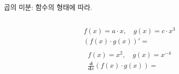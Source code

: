 \documentclass[aspectratio=169]{beamer}
\begin{document}
\begin{frame}{곱의 미분: 함수의 형태에 따라.}
  \begin{columns}
    \begin{column}{.5\textwidth}
      \begin{align*}
        & f(x) = a \cdot x , \quad g(x) = c \cdot x^3 \\
        & (f(x) \cdot g(x))' = \\
      \end{align*}
      \begin{align*}
        & f(x) = x^2 , \quad g(x) = x^{-4} \\
        & \frac{\mathbf{d}}{\mathbf{d}x}(f(x) \cdot g(x)) = \\
      \end{align*}
    \end{column}
  \end{columns}
\end{frame}
\end{document}
